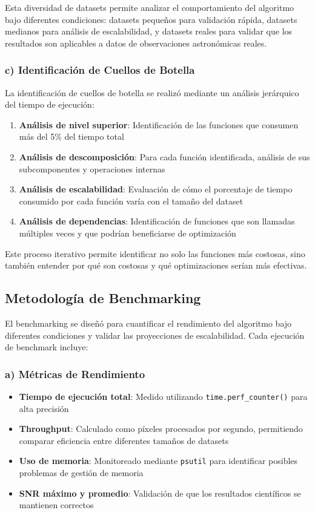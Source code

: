 Esta diversidad de datasets permite analizar el comportamiento del algoritmo bajo diferentes condiciones: datasets pequeños para validación rápida, datasets medianos para análisis de escalabilidad, y datasets reales para validar que los resultados son aplicables a datos de observaciones astronómicas reales.

\subsubsection{c) Identificación de Cuellos de Botella}

La identificación de cuellos de botella se realizó mediante un análisis jerárquico del tiempo de ejecución:

\begin{enumerate}
    \item \textbf{Análisis de nivel superior}: Identificación de las funciones que consumen más del 5\% del tiempo total
    \item \textbf{Análisis de descomposición}: Para cada función identificada, análisis de sus subcomponentes y operaciones internas
    \item \textbf{Análisis de escalabilidad}: Evaluación de cómo el porcentaje de tiempo consumido por cada función varía con el tamaño del dataset
    \item \textbf{Análisis de dependencias}: Identificación de funciones que son llamadas múltiples veces y que podrían beneficiarse de optimización
\end{enumerate}

Este proceso iterativo permite identificar no solo las funciones más costosas, sino también entender por qué son costosas y qué optimizaciones serían más efectivas.

\subsection{Metodología de Benchmarking}

El benchmarking se diseñó para cuantificar el rendimiento del algoritmo bajo diferentes condiciones y validar las proyecciones de escalabilidad. Cada ejecución de benchmark incluye:

\subsubsection{a) Métricas de Rendimiento}

\begin{itemize}
    \item \textbf{Tiempo de ejecución total}: Medido utilizando \texttt{time.perf\_counter()} para alta precisión
    \item \textbf{Throughput}: Calculado como píxeles procesados por segundo, permitiendo comparar eficiencia entre diferentes tamaños de datasets
    \item \textbf{Uso de memoria}: Monitoreado mediante \texttt{psutil} para identificar posibles problemas de gestión de memoria
    \item \textbf{SNR máximo y promedio}: Validación de que los resultados científicos se mantienen correctos
\end{itemize}


